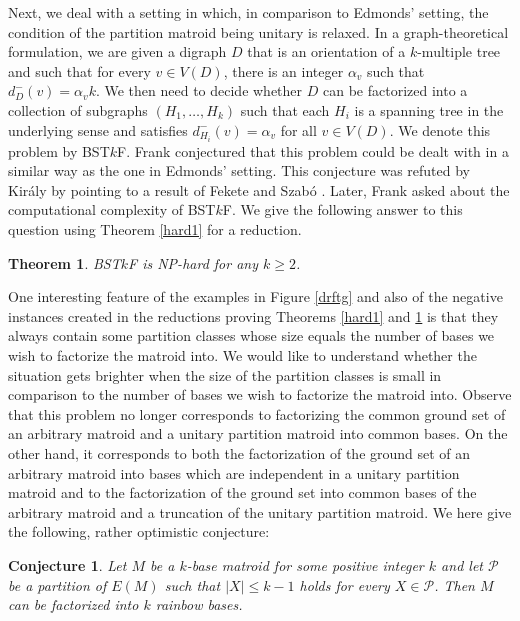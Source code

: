 \documentclass{article}
\newtheorem{Theorem}[Statement]{Theorem}
\newtheorem{Conjecture}[Statement]{Conjecture}
\begin{document}
Next, we deal with a setting in which, in comparison to Edmonds' setting, the condition of the partition matroid being unitary is relaxed. In a graph-theoretical formulation, we are given a digraph $D$ that is an orientation of a $k$-multiple tree and such that for every $v \in V(D)$, there is an integer $\alpha_v$ such that $d_D^-(v)=\alpha_v k$. We then need to decide whether $D$ can be factorized into a collection of subgraphs $(H_1,\ldots, H_k)$ such that each $H_i$ is a spanning tree in the underlying sense and satisfies $d_{H_i}^-(v)=\alpha_v$ for all $v \in V(D)$. We denote this problem by BST$k$F. Frank \cite{f1} conjectured that this problem could be dealt with in a similar way as the one in Edmonds' setting. This conjecture was refuted by Kir\'aly \cite{t} by pointing to a result of Fekete and Szab\'o \cite{fs}. Later, Frank \cite{book} asked about the computational complexity of BST$k$F. We give the following answer to this question using Theorem \ref{hard1} for a reduction.

 \begin{Theorem}\label{hard2}
BST$k$F is NP-hard for any $k \geq 2$.
\end{Theorem}

One interesting feature of the examples in Figure \ref{drftg} and also of the negative instances created in the reductions proving Theorems \ref{hard1} and \ref{hard2} is that they always contain some partition classes whose size equals the number of bases we wish to factorize the matroid into. We would like to understand whether the situation gets brighter when the size of the partition classes is small in comparison to the number of bases we wish to factorize the matroid into. Observe that this problem no longer corresponds to factorizing the common ground set of an arbitrary matroid and a unitary partition matroid into common bases. On the other hand, it corresponds to both the factorization of the ground set of an arbitrary matroid into bases which are independent in a unitary partition matroid and to the factorization of the ground set into common bases of the arbitrary matroid and a truncation of the unitary partition matroid. We here give the following, rather optimistic conjecture:

\begin{Conjecture}\label{optim}
Let $M$ be a $k$-base matroid for some positive integer $k$ and let $\mathcal{P}$ be a partition of $E(M)$ such that $|X|\leq k-1$ holds for every $X \in \mathcal{P}$. Then $M$ can be factorized into $k$ rainbow bases.
\end{Conjecture}
\end{document}
